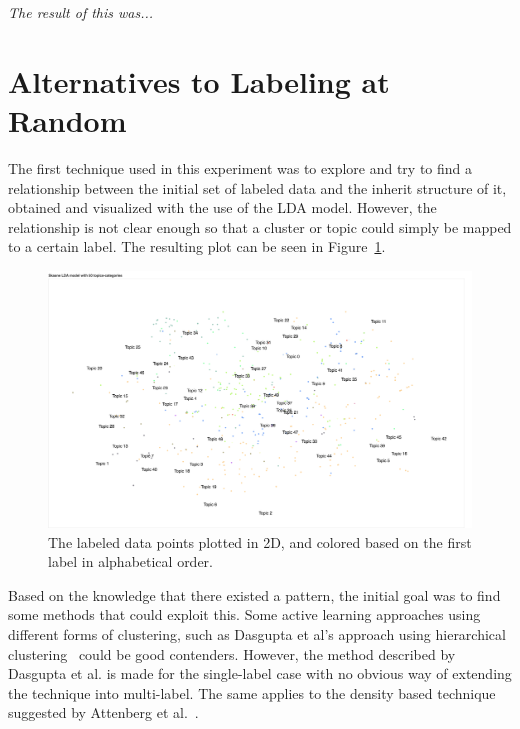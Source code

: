 \textit{The result of this was...}

\section{Alternatives to Labeling at Random}

The first technique used in this experiment was to explore and try to find a relationship between the initial set of labeled data and the inherit structure of it, obtained and visualized with the use of the LDA model.
However, the relationship is not clear enough so that a cluster or topic could simply be mapped to a certain label.
The resulting plot can be seen in Figure~\ref{fig:categories-lda-50}.

\begin{figure}
    \centering
    \includegraphics[scale=0.35, angle=270]{figures/categories-lda-50.png}
    \caption{The labeled data points plotted in 2D, and colored based on the first label in alphabetical order.}
    \label{fig:categories-lda-50}
\end{figure}

Based on the knowledge that there existed a pattern, the initial goal was to find some methods that could exploit this.
Some active learning approaches using different forms of clustering, such as Dasgupta et al\@'s approach using hierarchical clustering~\cite{dasgupta2008hierarchical} could be good contenders.
However, the method described by Dasgupta et al\@. is made for the single-label case with no obvious way of extending the technique into multi-label.
The same applies to the density based technique suggested by Attenberg et al\@.~\cite{attenberg2013class}.
